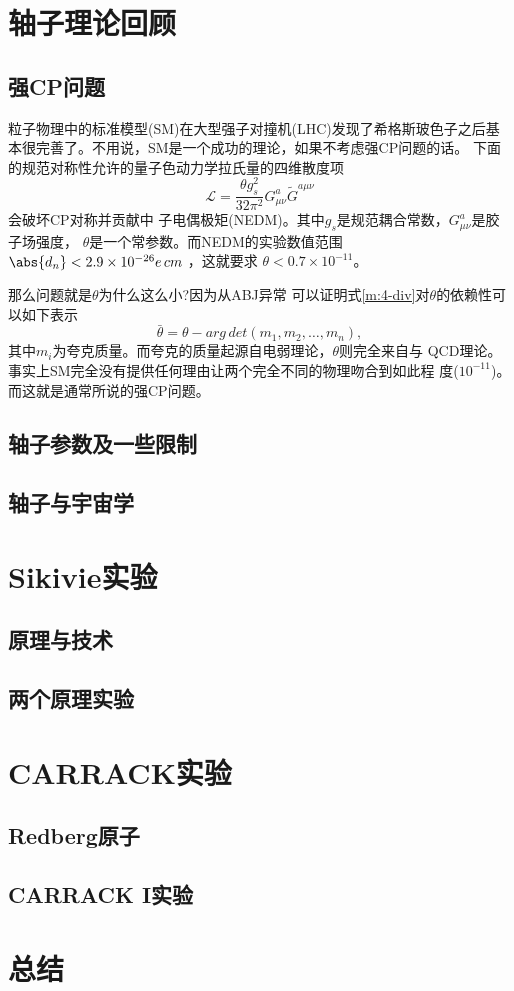 \documentclass[twocolumn,12pt,a4paper]{article}
\begin{document}
\section{轴子理论回顾}
\subsection{强CP问题}
粒子物理中的标准模型(SM)在大型强子对撞机(LHC)发现了希格斯玻色子之后基
本很完善了。不用说，SM是一个成功的理论，如果不考虑强CP问题的话。
下面的规范对称性允许的量子色动力学拉氏量的四维散度项
\begin{equation}
  \mathcal{L} = \frac{\theta g_s^2}{32\pi^2}G_{\mu\nu}^a\tilde{G}^{a\mu\nu}
  \label{m:4-div}
\end{equation}
会破坏CP对称并贡献中
子电偶极矩(NEDM)。其中$g_s$是规范耦合常数，$G_{\mu\nu}^a$是胶子场强度，
$\theta$是一个常参数。而NEDM的实验数值范围
$\abs{d_n}<2.9 \times 10^{-26} e\, cm$ \cite{baker06}，这就要求
$\theta<0.7\times10^{-11}$\cite{kim10}。\par
那么问题就是$\theta$为什么这么小?因为从ABJ异常
\cite{adler69}\cite{bell69}可以证明式\ref{m:4-div}对$\theta$的依赖性可
以如下表示
\begin{equation}
  \bar{\theta} = \theta - arg \, det(m_1,m_2, \ldots, m_n),
\end{equation}
其中$m_i$为夸克质量。而夸克的质量起源自电弱理论，$\theta$则完全来自与
QCD理论。事实上SM完全没有提供任何理由让两个完全不同的物理吻合到如此程
度($10^{-11}$)。而这就是通常所说的强CP问题。
\subsection{轴子参数及一些限制}
\subsection{轴子与宇宙学}

\section{Sikivie实验}
\subsection{原理与技术}
\subsection{两个原理实验}

\section{CARRACK实验}
\subsection{Redberg原子}
\subsection{CARRACK I实验}

\section{总结}

\medskip
\renewcommand{\refname}{参考文献}
\printbibliography
\end{document}
